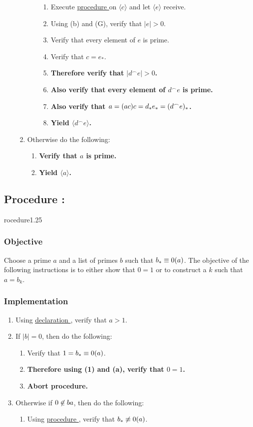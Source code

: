 \documentclass{article}
\let\div\relax\DeclareMathOperator{\div}{div}
\let\mod\relax\DeclareMathOperator{\mod}{mod}
\newcounter{declaration}[part]
\newcommand{\declarationhr}[1]{\hyperref[sec:declaration #1]{declaration \expandafter\csname declaration#1\endcsname}}
\newcounter{procedure}[part]
\newcommand{\procedure}[1]{\subsection*{Procedure \thepart:\theprocedure}\label{sec:procedure #1}\global\expandafter\edef\csname procedure#1\endcsname{\thepart:\theprocedure}\addtocounter{procedure}{1}}
\newcommand{\objective}{\subsubsection*{Objective}}
\newcommand{\implementation}{\subsubsection*{Implementation}}
\newcommand{\procedurehr}[1]{\hyperref[sec:procedure #1]{procedure \expandafter\csname procedure#1\endcsname}}
\begin{document}
\begin{multicols}{2}
\begin{enumerate}
\begin{enumerate}
\begin{enumerate}
\begin{enumerate}
								\item Execute \procedurehr{1.24} on $\langle c\rangle$ and let $\langle e\rangle$ receive.
								\item Using (b) and (G), verify that $\lvert e\rvert>0$.
								\item Verify that every element of $e$ is prime.
								\item Verify that $c=e_*$.
								\item \textbf{Therefore verify that $\lvert d^\frown e\rvert>0$.}
								\item \textbf{Also verify that every element of $d^\frown e$ is prime.}
								\item \textbf{Also verify that $a=(a\div c)c=d_*e_*=(d^\frown e)_*$.}
								\item \textbf{Yield $\langle d^\frown e\rangle$.}
							\end{enumerate}
						\end{enumerate}
						\item Otherwise do the following:
						\begin{enumerate}
							\item \textbf{Verify that $a$ is prime.}
							\item \textbf{Yield $\langle a\rangle$.}
						\end{enumerate}
					\end{enumerate}
				\end{enumerate}
		\procedure{1.25}
			\objective
				Choose a prime $a$ and a list of primes $b$ such that $b_*\equiv 0(\mod a)$. The objective of the following instructions is to either show that $0=1$ or to construct a $k$ such that $a=b_k$.
			\implementation
				\begin{enumerate}
					\item Using \declarationhr{1.06}, verify that $a>1$.
					\item If $\lvert b\rvert=0$, then do the following:
					\begin{enumerate}
						\item Verify that $1=b_*\equiv 0(\mod a)$.
						\item \textbf{Therefore using (1) and (a), verify that $0=1$.}
						\item \textbf{Abort procedure.}
					\end{enumerate}
					\item Otherwise if $0\not\in b\mod a$, then do the following:
					\begin{enumerate}
						\item Using \procedurehr{1.23}, verify that $b_*\not\equiv 0 (\mod a)$.

\end{enumerate}
\end{enumerate}
\end{multicols}
\end{document}
